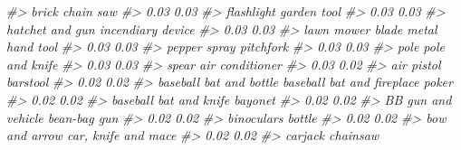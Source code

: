 \documentclass[
  12pt,
]{book}
\newenvironment{Shaded}{\begin{snugshade}}{\end{snugshade}}
\newcommand{\CommentTok}[1]{\textcolor[rgb]{0.37,0.37,0.37}{\textit{#1}}}
\begin{document}
\begin{Shaded}
\begin{Highlighting}[]
\CommentTok{\#\textgreater{}                            brick                        chain saw }
\CommentTok{\#\textgreater{}                             0.03                             0.03 }
\CommentTok{\#\textgreater{}                       flashlight                      garden tool }
\CommentTok{\#\textgreater{}                             0.03                             0.03 }
\CommentTok{\#\textgreater{}                  hatchet and gun                incendiary device }
\CommentTok{\#\textgreater{}                             0.03                             0.03 }
\CommentTok{\#\textgreater{}                 lawn mower blade                  metal hand tool }
\CommentTok{\#\textgreater{}                             0.03                             0.03 }
\CommentTok{\#\textgreater{}                     pepper spray                        pitchfork }
\CommentTok{\#\textgreater{}                             0.03                             0.03 }
\CommentTok{\#\textgreater{}                             pole                   pole and knife }
\CommentTok{\#\textgreater{}                             0.03                             0.03 }
\CommentTok{\#\textgreater{}                            spear                  air conditioner }
\CommentTok{\#\textgreater{}                             0.03                             0.02 }
\CommentTok{\#\textgreater{}                       air pistol                         barstool }
\CommentTok{\#\textgreater{}                             0.02                             0.02 }
\CommentTok{\#\textgreater{}          baseball bat and bottle baseball bat and fireplace poker }
\CommentTok{\#\textgreater{}                             0.02                             0.02 }
\CommentTok{\#\textgreater{}           baseball bat and knife                          bayonet }
\CommentTok{\#\textgreater{}                             0.02                             0.02 }
\CommentTok{\#\textgreater{}               BB gun and vehicle                     bean{-}bag gun }
\CommentTok{\#\textgreater{}                             0.02                             0.02 }
\CommentTok{\#\textgreater{}                       binoculars                           bottle }
\CommentTok{\#\textgreater{}                             0.02                             0.02 }
\CommentTok{\#\textgreater{}                    bow and arrow              car, knife and mace }
\CommentTok{\#\textgreater{}                             0.02                             0.02 }
\CommentTok{\#\textgreater{}                          carjack                         chainsaw }

\end{Highlighting}
\end{Shaded}
\end{document}
